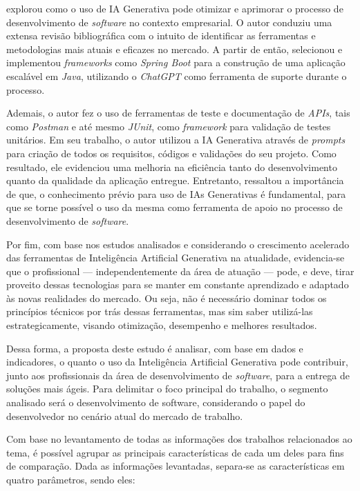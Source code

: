 \documentclass[english,brazilian]{UNISINOSartigo} %
\begin{document}
 explorou como o uso de IA Generativa pode otimizar e aprimorar o processo de desenvolvimento de \textit{software} no contexto empresarial. O autor conduziu uma extensa revisão bibliográfica com o intuito de identificar as ferramentas e metodologias mais atuais e eficazes no mercado. A partir de então, selecionou e implementou \textit{frameworks} como \textit{Spring Boot} para a construção de uma aplicação escalável em \textit{Java}, utilizando o \textit{ChatGPT} como ferramenta de suporte durante o processo.

Ademais, o autor \cite{costa2024} fez o uso de ferramentas de teste e documentação de \textit{APIs}, tais como \textit{Postman} e até mesmo \textit{JUnit}, como \textit{framework} para validação de testes unitários. Em seu trabalho, o autor utilizou a IA Generativa através de \textit{prompts} para criação de todos os requisitos, códigos e validações do seu projeto. Como resultado, ele evidenciou uma melhoria na eficiência tanto do desenvolvimento quanto da qualidade da aplicação entregue. Entretanto, ressaltou a importância de que, o conhecimento prévio para uso de IAs Generativas é fundamental, para que se torne possível o uso da mesma como ferramenta de apoio no processo de desenvolvimento de \textit{software}.

Por fim, com base nos estudos analisados e considerando o crescimento acelerado das ferramentas de Inteligência Artificial Generativa na atualidade, evidencia-se que o profissional — independentemente da área de atuação — pode, e deve, tirar proveito dessas tecnologias para se manter em constante aprendizado e adaptado às novas realidades do mercado. Ou seja, não é necessário dominar todos os princípios técnicos por trás dessas ferramentas, mas sim saber utilizá-las estrategicamente, visando otimização, desempenho e melhores resultados.

Dessa forma, a proposta deste estudo é analisar, com base em dados e indicadores, o quanto o uso da Inteligência Artificial Generativa pode contribuir, junto aos profissionais da área de desenvolvimento de \textit{software}, para a entrega de soluções mais ágeis. Para delimitar o foco principal do trabalho, o segmento analisado será o desenvolvimento de software, considerando o papel do desenvolvedor no cenário atual do mercado de trabalho.

Com base no levantamento de todas as informações dos trabalhos relacionados ao tema, é possível agrupar as principais características de cada um deles para fins de comparação. Dada as informações levantadas, separa-se as características em quatro parâmetros, sendo eles:
\end{document}
